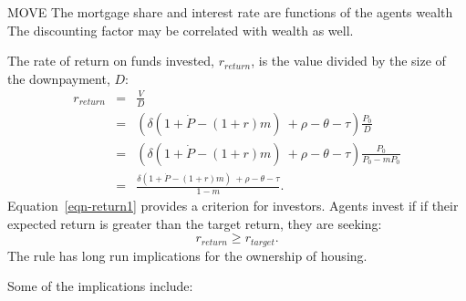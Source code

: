  MOVE The mortgage share and interest rate are functions of the agents wealth %
The discounting factor may be correlated with wealth as well. 

The rate of return on funds invested, $r_{return}$, is the value divided by the size of the downpayment, $D$: 
\begin{eqnarray}
r_{return} 
  &=& \frac{V}{D}  \nonumber \\
  &=& \left(\delta \left(1+\dot P - (1+r)m\right) \ + \rho - \theta - \tau \right) \frac{P_0}{D}        \nonumber \\
  &=& \left(\delta \left(1+\dot P - (1+r)m\right) \ + \rho - \theta - \tau \right) \frac{P_0}{P_0-mP_0} \nonumber \\ 
  &=& \frac{\delta \left(1+\dot P - (1+r)m\right) \ + \rho - \theta - \tau }{1-m}.
\label{eqn-return1}
\end{eqnarray}
Equation~\ref{eqn-return1} provides a criterion for investors. Agents invest if if their expected return is greater than the target return, they are seeking:
\begin{equation}
r_{return} \geq r_{target}. \label{eqn-return2}
\end{equation}
The rule has long run implications for the ownership of housing. 

Some of the implications include:

